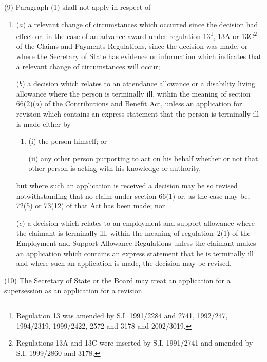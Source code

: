 \documentclass[12pt,a4paper]{article}
\begin{document}
(9) Paragraph (1) shall not apply in respect of—
\begin{enumerate}\item[]
($a$) a relevant change of circumstances which occurred since the decision 
had effect  %
or, in the case of an advance award under regulation 13\footnote{Regulation 13 was amended by S.I. 1991/2284 and 2741, 1992/247, 1994/2319, 1999/2422, 2572 and 3178 and 2002/3019.}, 13A or 13C\footnote{Regulations 13A and 13C were inserted by S.I. 1991/2741 and amended by S.I. 1999/2860 and 3178.} of the Claims and Payments Regulations, since the decision was made,  %
or where the Secretary of State has evidence or information which indicates that a relevant change of circumstances will occur; 

($b$) a decision which relates to an attendance allowance or a disability living allowance where the person is terminally ill, within the meaning of section 66(2)($a$) of the Contributions and Benefit Act, unless an application for revision which contains an express statement that the person is terminally ill is made either by—
\begin{enumerate}\item[]
(i) the person himself; or

(ii) any other person purporting to act on his behalf whether or not that other person is acting with his knowledge or authority,
\end{enumerate}
but where such an application is received a decision may be so revised notwithstanding that no claim under section 66(1) or, as the case may be, 72(5) or 73(12) of that Act has been made;
%
nor

($c$) a decision which relates to an employment and support allowance where the claimant is terminally ill, within the meaning of regulation~2(1) of the Employment and Support Allowance Regulations unless the claimant makes an application which contains an express statement that he is terminally ill and where such an application is made, the decision may be revised.
\end{enumerate}

(10) The Secretary of State 
or the Board  %
may treat an application for a supersession as an application for a revision.
\end{document}
